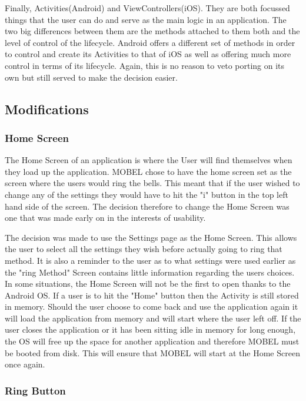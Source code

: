 \documentclass{l4proj}
\begin{document}
Finally, Activities(Android) and ViewControllers(iOS). They are both focussed things that the user can do and serve as the main logic in an application. The two big differences between them are the methods attached to them both and the level of control of the lifecycle.  Android offers a different set of methods in order to control and create its Activities to that of iOS as well as offering much more control in terms of its lifecycle. Again, this is no reason to veto porting on its own but still served to make the decision easier.

\subsection{Modifications}

\subsubsection{Home Screen}
The Home Screen of an application is where the User will find themselves when they load up the application. MOBEL chose to have the home screen set as the screen where the users would ring the bells.  This meant that if the user wished to change any of the settings they would have to hit the "i" button in the top left hand side of the screen. The decision therefore to change the Home Screen was one that was made early on in the interests of usability.  

The decision was made to use the Settings page as the Home Screen.  This allows the user to select all the settings they wish before actually going to ring that method.  It is also a reminder to the user as to what settings were used earlier as the "ring Method" Screen contains little information regarding the users choices. In some situations, the Home Screen will not be the first to open thanks to the Android OS.  If a user is to hit the "Home" button then the Activity is still stored in memory.  Should the user choose to come back and use the application again it will load the application from memory and will start where the user left off.  If the user closes the application or it has been sitting idle in memory for long enough, the OS will free up the space for another application and therefore MOBEL must be booted from disk.  This will ensure that MOBEL will start at the Home Screen once again.

\subsubsection{Ring Button}
\end{document}
